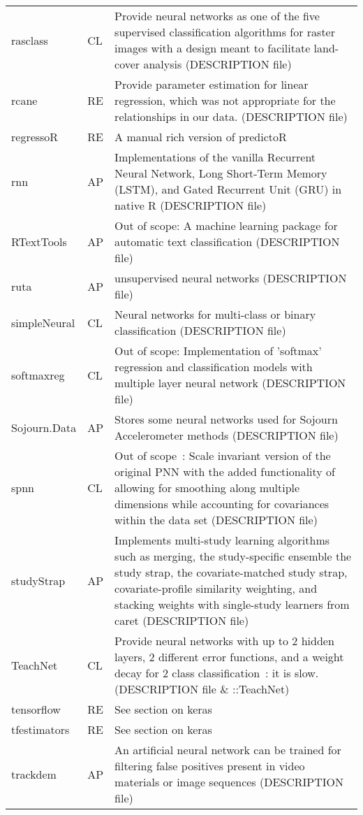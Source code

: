 \begin{Schunk}
\begin{longtable}[t]{ll>{\raggedright\arraybackslash}p{10cm}}
rasclass & CL & Provide neural networks as one of the five supervised classification algorithms for raster images with a design meant to facilitate land-cover analysis (DESCRIPTION file)\\
rcane & RE & Provide parameter estimation for linear regression, which was not appropriate for the relationships in our data. (DESCRIPTION file)\\
\addlinespace
regressoR & RE & A manual rich version of predictoR\\
rnn & AP & Implementations of the vanilla Recurrent Neural Network, Long Short-Term Memory (LSTM), and Gated Recurrent Unit (GRU) in native R (DESCRIPTION file)\\
RTextTools & AP & Out of scope: A machine learning package for automatic text classification (DESCRIPTION file)\\
ruta & AP & unsupervised neural networks (DESCRIPTION file)\\
simpleNeural & CL & Neural networks for multi-class or binary classification (DESCRIPTION file)\\
\addlinespace
softmaxreg & CL & Out of scope: Implementation of 'softmax' regression and classification models with multiple layer neural network (DESCRIPTION file)\\
Sojourn.Data & AP & Stores some neural networks used for Sojourn Accelerometer methods (DESCRIPTION file)\\
spnn & CL & Out of scope : Scale invariant version of the original PNN with the added functionality of allowing for smoothing along multiple dimensions while accounting for covariances within the data set (DESCRIPTION file)\\
studyStrap & AP & Implements multi-study learning algorithms such as merging, the study-specific ensemble the study strap, the covariate-matched study strap, covariate-profile similarity weighting, and stacking weights with single-study learners from caret (DESCRIPTION file)\\
TeachNet & CL & Provide neural networks with up to 2 hidden layers, 2 different error functions, and a weight decay for 2 class classification : it is slow. (DESCRIPTION file \& ::TeachNet)\\
\addlinespace
tensorflow & RE & See section on keras\\
tfestimators & RE & See section on keras\\
trackdem & AP & An artificial neural network can be trained for filtering false positives present in video materials or image sequences (DESCRIPTION file)\\

\end{longtable}
\end{Schunk}
